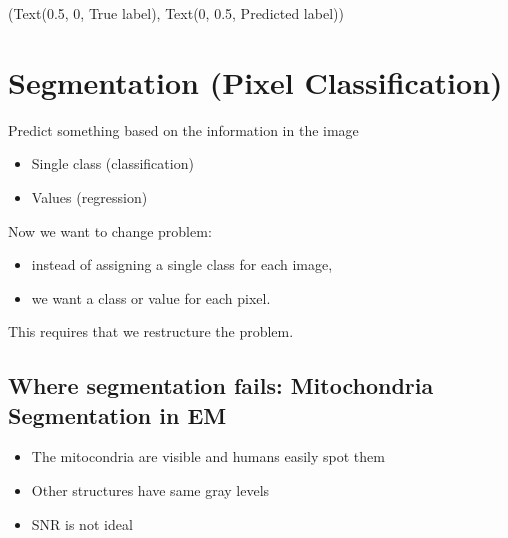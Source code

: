 \documentclass[letterpaper,10pt,english]{sphinxmanual}
\begin{document}
\begin{sphinxVerbatim}[commandchars=\\\{\}]
(Text(0.5, 0, \PYGZsq{}True label\PYGZsq{}), Text(0, 0.5, \PYGZsq{}Predicted label\PYGZsq{}))
\end{sphinxVerbatim}

\noindent{}


\chapter{Segmentation (Pixel Classification)}
\label{\detokenize{05-SupervisedSegmentation:segmentation-pixel-classification}}
\sphinxAtStartPar
{}
Predict something based on the information in the image
\begin{itemize}
\item {} 
\sphinxAtStartPar
Single class (classification)

\item {} 
\sphinxAtStartPar
Values (regression)

\end{itemize}

\sphinxAtStartPar
{}
Now we want to change problem:
\begin{itemize}
\item {} 
\sphinxAtStartPar
instead of assigning a single class for each image,

\item {} 
\sphinxAtStartPar
we want a class or value for each pixel.

\end{itemize}

\sphinxAtStartPar
This requires that we restructure the problem.


\section{Where segmentation fails: Mitochondria Segmentation in EM}
\label{\detokenize{05-SupervisedSegmentation:where-segmentation-fails-mitochondria-segmentation-in-em}}

\begin{itemize}
\item {} 
\sphinxAtStartPar
The mitocondria are visible and humans easily spot them

\item {} 
\sphinxAtStartPar
Other structures have same gray levels

\item {} 
\sphinxAtStartPar
SNR is not ideal

\end{itemize}
\end{document}
